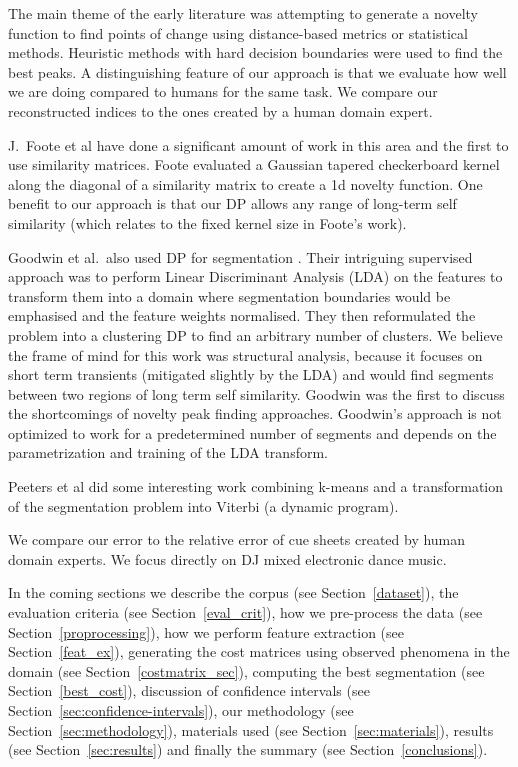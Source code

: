 \documentclass[twocolumn]{article}
\begin{document}
	The main theme of the early literature was attempting to generate a novelty function to find points of change using distance-based metrics or statistical methods. Heuristic methods with hard decision boundaries were used to find the best peaks. A distinguishing feature of our approach is that we evaluate how well we are doing compared to humans for the same task. We compare our reconstructed indices to the ones created by a human domain expert. 
	
	J.\ Foote et al \citep{foote1999visualizing,foote1997similarity,foote2000automatic,foote2003media,foote2001visualizing} have done a significant amount of work in this area and the first to use similarity matrices. Foote evaluated a Gaussian tapered checkerboard kernel along the diagonal of a similarity matrix to create a 1d novelty function. One benefit to our approach is that our DP allows any range of long-term self similarity (which relates to the fixed kernel size in Foote's work).
	
	Goodwin et al.\ also used DP for segmentation \citep{goodwin2003audio,goodwin2004dynamic}. Their intriguing supervised approach was to perform Linear Discriminant Analysis (LDA) on the features to transform them into a domain where segmentation boundaries would be emphasised and the feature weights normalised. They then reformulated the problem into a clustering DP to find an arbitrary number of clusters. We believe the frame of mind for this work was structural analysis, because it focuses on short term transients (mitigated slightly by the LDA) and would find segments between two regions of long term self similarity. Goodwin was the first to discuss the shortcomings of novelty peak finding approaches. Goodwin's approach is not optimized to work for a predetermined number of segments and depends on the parametrization and training of the LDA transform. 
	
	Peeters et al \citep{peeters2002toward,peeters2004deriving} did some interesting work combining k-means and a transformation of the segmentation problem into Viterbi (a dynamic program).
	
	We compare our error to the relative error of cue sheets created by human domain experts. We focus directly on DJ mixed electronic dance music.
	
	In the coming sections we describe the corpus (see Section~\ref{dataset}), the evaluation criteria (see Section~\ref{eval_crit}), how we pre-process the data (see Section~\ref{proprocessing}), how we perform feature extraction (see Section~\ref{feat_ex}), generating the cost matrices using observed phenomena in the domain (see Section~\ref{costmatrix_sec}), computing the best segmentation (see Section~\ref{best_cost}), discussion of confidence intervals (see Section~\ref{sec:confidence-intervals}), our methodology (see Section~\ref{sec:methodology}), materials used (see Section~\ref{sec:materials}), results (see Section~\ref{sec:results}) and finally the summary (see Section~\ref{conclusions}).
	
\end{document}
